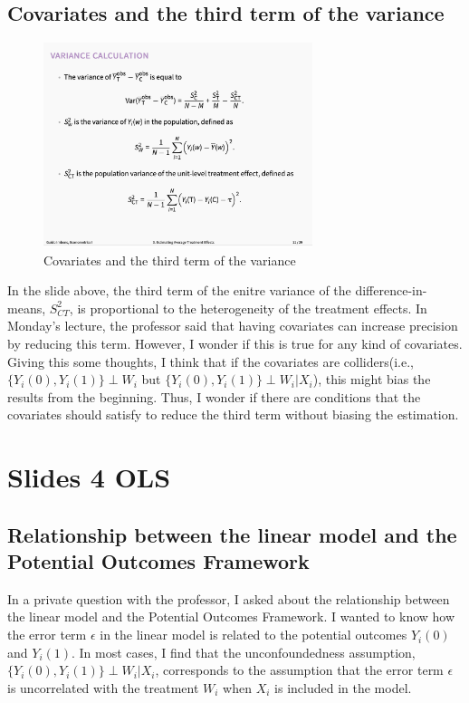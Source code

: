 \documentclass[11pt]{article}
\numberwithin{equation}{section}
\begin{document}
\subsection{Covariates and the third term of the variance}

\begin{figure}[ht]
    \centering
    \includegraphics[width=0.7\textwidth]{images/wk2-2.png}
    \caption{Covariates and the third term of the variance}
    \label{fig:covariates-and-variance}
\end{figure}

In the slide above, the third term of the enitre variance of the difference-in-means, $S_{CT}^2$, is proportional to the heterogeneity of the treatment effects.
In Monday's lecture, the professor said that having covariates can increase precision by reducing this term.
However, I wonder if this is true for any kind of covariates. Giving this some thoughts, I think that if the covariates are colliders(i.e., $\{Y_i(0), Y_i(1)\} \perp W_i$ but $\{Y_i(0), Y_i(1)\} \perp W_i |X_i$),
this might bias the results from the beginning. 
Thus, I wonder if there are conditions that the covariates should satisfy to reduce the third term without biasing the estimation.

\section{Slides 4 OLS}

\subsection{Relationship between the linear model and the Potential Outcomes Framework}

In a private question with the professor, I asked about the relationship between the linear model and the Potential Outcomes Framework.
I wanted to know how the error term $\epsilon$ in the linear model is related to the potential outcomes $Y_i(0)$ and $Y_i(1)$.
In most cases, I find that the unconfoundedness assumption, $\{Y_i(0), Y_i(1)\} \perp W_i | X_i$, corresponds to the assumption that the error term $\epsilon$ is uncorrelated with the treatment $W_i$ when $X_i$ is included in the model.
\end{document}
